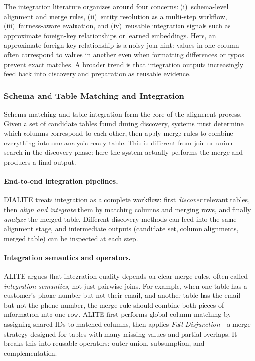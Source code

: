 \documentclass[sigconf]{acmart}
\begin{document}
The integration literature organizes around four concerns: (i)~schema-level alignment and merge rules, (ii)~entity resolution as a multi-step workflow, (iii)~fairness-aware evaluation, and (iv)~reusable integration signals such as approximate foreign-key relationships or learned embeddings. Here, an approximate foreign-key relationship is a noisy join hint: values in one column often correspond to values in another even when formatting differences or typos prevent exact matches. A broader trend is that integration outputs increasingly feed back into discovery and preparation as reusable evidence.


\subsubsection{Schema and Table Matching and Integration}
\label{sec:lit-sm-integration}

Schema matching and table integration form the core of the alignment process. Given a set of candidate tables found during discovery, systems must determine which columns correspond to each other, then apply merge rules to combine everything into one analysis-ready table. This is different from join or union search in the discovery phase: here the system actually performs the merge and produces a final output.

\paragraph{End-to-end integration pipelines.}
DIALITE treats integration as a complete workflow: first \emph{discover} relevant tables, then \emph{align and integrate} them by matching columns and merging rows, and finally \emph{analyze} the merged table. Different discovery methods can feed into the same alignment stage, and intermediate outputs (candidate set, column alignments, merged table) can be inspected at each step.

\paragraph{Integration semantics and operators.}
ALITE argues that integration quality depends on clear merge rules, often called \emph{integration semantics}, not just pairwise joins. For example, when one table has a customer's phone number but not their email, and another table has the email but not the phone number, the merge rule should combine both pieces of information into one row. ALITE first performs global column matching by assigning shared IDs to matched columns, then applies \emph{Full Disjunction}---a merge strategy designed for tables with many missing values and partial overlaps. It breaks this into reusable operators: outer union, subsumption, and complementation.
\end{document}
